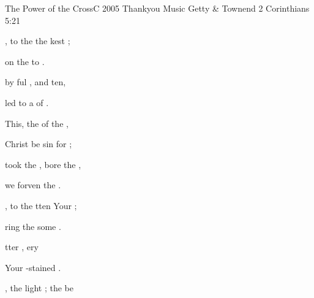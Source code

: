 \begin{song}{The Power of the Cross}{C}
    {2005 Thankyou Music}
    {Getty \& Townend}
    {2 Corinthians 5:21}
    {\CCLIed}

    \Ch{Intro: [Am}{}  \Ch{C]x2}{}
    \begin{SBVerse}
        
        , to  the  
             the kest ; 

         on the  to 
            .

         by ful , 
             and ten, 

        led to a  of .

    \end{SBVerse}

    \begin{SBChorus}

        This, the  of the ,

        Christ be sin for ;

        took the , bore the ,

        we  forven  the . 
            \Ch{[Am}{}  \Ch{C]}{}

    \end{SBChorus}

    \begin{SBVerse}
        
        , to  the  
            tten  Your ; 

        ring the some
              .

         tter , 
            ery  

         Your -stained .

    \end{SBVerse}

    \begin{SBVerse}
        
        , the light ; 
             the  be


\end{SBVerse}
\end{song}
